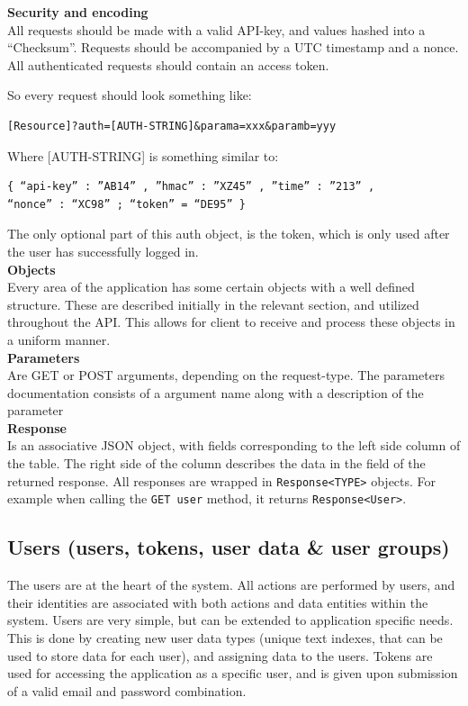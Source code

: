 \documentclass[11pt]{article}
\begin{document}
\textbf{Security and encoding} \\
All requests should be made with a valid API-key, and values hashed into a “Checksum”. Requests should be accompanied by a UTC timestamp and a nonce. All authenticated requests should contain an access token.

So every request should look something like: 
\begin{verbatim}
[Resource]?auth=[AUTH-STRING]&parama=xxx&paramb=yyy
\end{verbatim}

Where [AUTH-STRING] is something similar to:
\begin{verbatim}
{ “api-key” : ”AB14” , ”hmac” : ”XZ45” , ”time” : ”213” , 
“nonce” : “XC98” ; “token” = “DE95” }
\end{verbatim}


The only optional part of this auth object, is the token, which is only used after the user has successfully logged in. \\

\textbf{Objects} \\
Every area of the application has some certain objects with a well defined structure. These are described initially in the relevant section, and utilized throughout the API. This allows for client to receive and process these objects in a uniform manner.\\

\textbf{Parameters} \\
Are GET or POST arguments, depending on the request-type. The parameters documentation consists of a argument name along with a description of the parameter \\

\textbf{Response} \\
Is an associative JSON object, with fields corresponding to the left side column of the table. The right side of the column describes the data in the field of the returned response.
All responses are wrapped in \texttt{Response<TYPE>} objects. For example when calling the \texttt{GET user} method, it returns \texttt{Response<User>}.

\newpage

\subsection{Users (users, tokens, user data \& user groups)}

The users are at the heart of the system. All actions are performed by users, and their identities are associated with both actions and data entities within the system. Users are very simple, but can be extended to application specific needs. This is done by creating new user data types (unique text indexes, that can be used to store data for each user), and assigning data to the users. Tokens are used for accessing the application as a specific user, and is given upon submission of a valid email and password combination.
\end{document}
